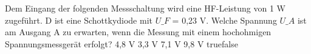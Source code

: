     {Dem Eingang der folgenden Messschaltung wird eine HF-Leistung von 1 W zugeführt. D ist eine Schottkydiode mit $U\_F$ = 0,23 V. Welche Spannung $U\_A$ ist am Ausgang A zu erwarten, wenn die Messung mit einem hochohmigen Spannungsmessgerät erfolgt?}
    {4,8 V}
    {3,3 V}
    {7,1 V}
    {9,8 V}
    {true}{false}